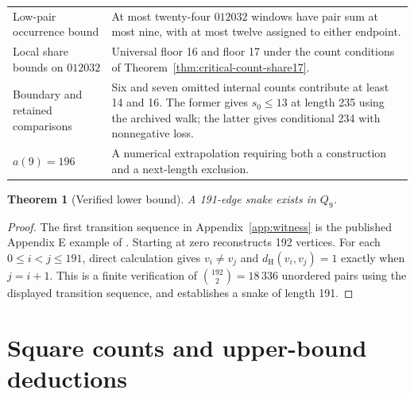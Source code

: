 \documentclass[11pt,a4paper]{article}
\newtheorem{theorem}{Theorem}[section]
\theoremstyle{definition}
\theoremstyle{remark}
\newcommand{\Q}{Q}
\newcommand{\Ham}{d_{\mathrm H}}
\begin{document}
\begin{center}
\begin{tabular}{p{}p{}}
Low-pair occurrence bound & At most twenty-four $012032$ windows have pair sum at most nine, with at most twelve assigned to either endpoint.\\
Local share bounds on $012032$ & Universal floor 16 and floor 17 under the count conditions of Theorem~\ref{thm:critical-count-share17}.\\
Boundary and retained comparisons & Six and seven omitted internal counts contribute at least 14 and 16. The former gives $s_0\le13$ at length 235 using the archived walk; the latter gives conditional 234 with nonnegative loss.\\
$a(9)=196$ & A numerical extrapolation requiring both a construction and a next-length exclusion.\\
\bottomrule
\end{tabular}
\end{center}

\begin{theorem}[Verified lower bound]\label{thm:lower}
A 191-edge snake exists in $\Q_9$.
\end{theorem}
\begin{proof}
The first transition sequence in Appendix~\ref{app:witness} is the published Appendix E example of \cite{orland}. Starting at zero reconstructs 192 vertices. For each $0\le i<j\le191$, direct calculation gives $v_i\ne v_j$ and $\Ham(v_i,v_j)=1$ exactly when $j=i+1$. This is a finite verification of $\binom{192}{2}=18\,336$ unordered pairs using the displayed transition sequence, and establishes a snake of length 191.
\end{proof}

\part{Square counts and upper-bound deductions}
\end{document}
